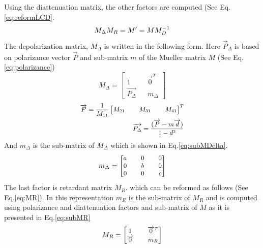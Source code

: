 \documentclass[oneside,a4,12p]{report} %
\begin{document}
Using the diattenuation matrix, the other factors are computed (See Eq.\ref{eq:reformLCD}. 
	\begin{equation}\label{eq:reformLCD}
	\small
	M_{\Delta}M_{R} = M' = M M_{D}^{-1}
	\end{equation}
The depolarization matrix, $M_{\Delta}$ is written in the following form. Here $\overrightarrow{P}_{\Delta}$ is based on polarizance vector $\overrightarrow{P}$  and sub-matrix $m$ of the Mueller matrix $M$ (See Eq.\ref{eq:polarizance}) 
	\begin{equation}\label{eq:MDelta}
	M_{\Delta} = \begin{bmatrix}
	1 && \overrightarrow{0}^{T}\\ \overrightarrow{P_{\Delta}} && m_{\Delta}
	\end{bmatrix}
	\end{equation}	
	\begin{subequations}\label{eq:polarizance}
	\small
	\begin{align}	
	\overrightarrow{P} = \frac{1}{M_{11}}\begin{bmatrix}
	M_{21} && M_{31} && M_{41}
	\end{bmatrix}^{T}\\
	\overrightarrow{P_{\Delta}} = \frac{(\overrightarrow{P} - m \overrightarrow{d})}{1-d^{2}}	
	\end{align}
	\end{subequations}
And $m_{\Delta}$ is the sub-matrix of $M_{\Delta}$ which is shown in Eq.\ref{eq:subMDelta}.
	\begin{equation}\label{eq:subMDelta}
	\small
	m_{\Delta} = \begin{bmatrix}
	a && 0 && 0\\
	0 && b && 0\\
	0 && 0 && c
	\end{bmatrix}	
	\end{equation}
The last factor is retardant matrix $M_{R}$. which can be reformed as follows (See Eq.\ref{eq:MR}). In this representation $m_{R}$ is the sub-matrix of $M_{R}$ and is computed using polarizance and diattenuation factors and sub-matrix of $M$ as it is presented in Eq.\ref{eq:subMR}
	\begin{equation}\label{eq:MR}
	\small
	M_{R} = \begin{bmatrix}
	1 && \overrightarrow{0}^{T}\\
	\overrightarrow{0} && m_{R}
	\end{bmatrix}	
	\end{equation}		
	
\end{document}
